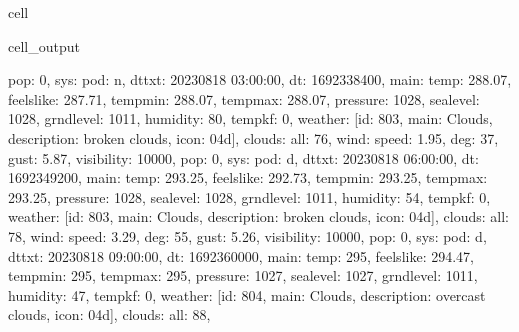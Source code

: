 \documentclass[letterpaper,10pt,english]{jupyterBook}
\begin{document}
\begin{sphinxuseclass}{cell}
\begin{sphinxVerbatimOutput}
\begin{sphinxuseclass}{cell_output}
\begin{sphinxVerbatim}[commandchars=\\\{\}]
\PYGZsq{}pop\PYGZsq{}: 0, \PYGZsq{}sys\PYGZsq{}: \PYGZob{}\PYGZsq{}pod\PYGZsq{}: \PYGZsq{}n\PYGZsq{}\PYGZcb{}, \PYGZsq{}dt\PYGZus{}txt\PYGZsq{}: \PYGZsq{}2023\PYGZhy{}08\PYGZhy{}18 03:00:00\PYGZsq{}\PYGZcb{}, \PYGZob{}\PYGZsq{}dt\PYGZsq{}: 1692338400, \PYGZsq{}main\PYGZsq{}: \PYGZob{}\PYGZsq{}temp\PYGZsq{}: 288.07, \PYGZsq{}feels\PYGZus{}like\PYGZsq{}: 287.71, \PYGZsq{}temp\PYGZus{}min\PYGZsq{}: 288.07, \PYGZsq{}temp\PYGZus{}max\PYGZsq{}: 288.07, \PYGZsq{}pressure\PYGZsq{}: 1028, \PYGZsq{}sea\PYGZus{}level\PYGZsq{}: 1028, \PYGZsq{}grnd\PYGZus{}level\PYGZsq{}: 1011, \PYGZsq{}humidity\PYGZsq{}: 80, \PYGZsq{}temp\PYGZus{}kf\PYGZsq{}: 0\PYGZcb{}, \PYGZsq{}weather\PYGZsq{}: [\PYGZob{}\PYGZsq{}id\PYGZsq{}: 803, \PYGZsq{}main\PYGZsq{}: \PYGZsq{}Clouds\PYGZsq{}, \PYGZsq{}description\PYGZsq{}: \PYGZsq{}broken clouds\PYGZsq{}, \PYGZsq{}icon\PYGZsq{}: \PYGZsq{}04d\PYGZsq{}\PYGZcb{}], \PYGZsq{}clouds\PYGZsq{}: \PYGZob{}\PYGZsq{}all\PYGZsq{}: 76\PYGZcb{}, \PYGZsq{}wind\PYGZsq{}: \PYGZob{}\PYGZsq{}speed\PYGZsq{}: 1.95, \PYGZsq{}deg\PYGZsq{}: 37, \PYGZsq{}gust\PYGZsq{}: 5.87\PYGZcb{}, \PYGZsq{}visibility\PYGZsq{}: 10000, \PYGZsq{}pop\PYGZsq{}: 0, \PYGZsq{}sys\PYGZsq{}: \PYGZob{}\PYGZsq{}pod\PYGZsq{}: \PYGZsq{}d\PYGZsq{}\PYGZcb{}, \PYGZsq{}dt\PYGZus{}txt\PYGZsq{}: \PYGZsq{}2023\PYGZhy{}08\PYGZhy{}18 06:00:00\PYGZsq{}\PYGZcb{}, \PYGZob{}\PYGZsq{}dt\PYGZsq{}: 1692349200, \PYGZsq{}main\PYGZsq{}: \PYGZob{}\PYGZsq{}temp\PYGZsq{}: 293.25, \PYGZsq{}feels\PYGZus{}like\PYGZsq{}: 292.73, \PYGZsq{}temp\PYGZus{}min\PYGZsq{}: 293.25, \PYGZsq{}temp\PYGZus{}max\PYGZsq{}: 293.25, \PYGZsq{}pressure\PYGZsq{}: 1028, \PYGZsq{}sea\PYGZus{}level\PYGZsq{}: 1028, \PYGZsq{}grnd\PYGZus{}level\PYGZsq{}: 1011, \PYGZsq{}humidity\PYGZsq{}: 54, \PYGZsq{}temp\PYGZus{}kf\PYGZsq{}: 0\PYGZcb{}, \PYGZsq{}weather\PYGZsq{}: [\PYGZob{}\PYGZsq{}id\PYGZsq{}: 803, \PYGZsq{}main\PYGZsq{}: \PYGZsq{}Clouds\PYGZsq{}, \PYGZsq{}description\PYGZsq{}: \PYGZsq{}broken clouds\PYGZsq{}, \PYGZsq{}icon\PYGZsq{}: \PYGZsq{}04d\PYGZsq{}\PYGZcb{}], \PYGZsq{}clouds\PYGZsq{}: \PYGZob{}\PYGZsq{}all\PYGZsq{}: 78\PYGZcb{}, \PYGZsq{}wind\PYGZsq{}: \PYGZob{}\PYGZsq{}speed\PYGZsq{}: 3.29, \PYGZsq{}deg\PYGZsq{}: 55, \PYGZsq{}gust\PYGZsq{}: 5.26\PYGZcb{}, \PYGZsq{}visibility\PYGZsq{}: 10000, \PYGZsq{}pop\PYGZsq{}: 0, \PYGZsq{}sys\PYGZsq{}: \PYGZob{}\PYGZsq{}pod\PYGZsq{}: \PYGZsq{}d\PYGZsq{}\PYGZcb{}, \PYGZsq{}dt\PYGZus{}txt\PYGZsq{}: \PYGZsq{}2023\PYGZhy{}08\PYGZhy{}18 09:00:00\PYGZsq{}\PYGZcb{}, \PYGZob{}\PYGZsq{}dt\PYGZsq{}: 1692360000, \PYGZsq{}main\PYGZsq{}: \PYGZob{}\PYGZsq{}temp\PYGZsq{}: 295, \PYGZsq{}feels\PYGZus{}like\PYGZsq{}: 294.47, \PYGZsq{}temp\PYGZus{}min\PYGZsq{}: 295, \PYGZsq{}temp\PYGZus{}max\PYGZsq{}: 295, \PYGZsq{}pressure\PYGZsq{}: 1027, \PYGZsq{}sea\PYGZus{}level\PYGZsq{}: 1027, \PYGZsq{}grnd\PYGZus{}level\PYGZsq{}: 1011, \PYGZsq{}humidity\PYGZsq{}: 47, \PYGZsq{}temp\PYGZus{}kf\PYGZsq{}: 0\PYGZcb{}, \PYGZsq{}weather\PYGZsq{}: [\PYGZob{}\PYGZsq{}id\PYGZsq{}: 804, \PYGZsq{}main\PYGZsq{}: \PYGZsq{}Clouds\PYGZsq{}, \PYGZsq{}description\PYGZsq{}: \PYGZsq{}overcast clouds\PYGZsq{}, \PYGZsq{}icon\PYGZsq{}: \PYGZsq{}04d\PYGZsq{}\PYGZcb{}], \PYGZsq{}clouds\PYGZsq{}: \PYGZob{}\PYGZsq{}all\PYGZsq{}: 88\PYGZcb{}, 
\end{sphinxVerbatim}
\end{sphinxuseclass}
\end{sphinxVerbatimOutput}
\end{sphinxuseclass}
\end{document}
